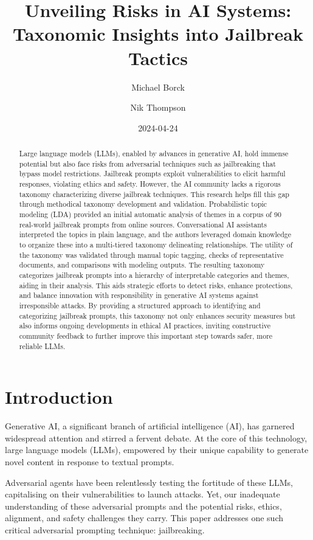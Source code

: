 \documentclass[
  letterpaper,
  DIV=11,
  numbers=noendperiod]{scrartcl}
\title{Unveiling Risks in AI Systems: Taxonomic Insights into Jailbreak
Tactics}
\author{Michael Borck \and Nik Thompson}
\date{2024-04-24}
\begin{document}
\maketitle
\begin{abstract}
Large language models (LLMs), enabled by advances in generative AI, hold
immense potential but also face risks from adversarial techniques such
as jailbreaking that bypass model restrictions. Jailbreak prompts
exploit vulnerabilities to elicit harmful responses, violating ethics
and safety. However, the AI community lacks a rigorous taxonomy
characterizing diverse jailbreak techniques. This research helps fill
this gap through methodical taxonomy development and validation.
Probabilistic topic modeling (LDA) provided an initial automatic
analysis of themes in a corpus of 90 real-world jailbreak prompts from
online sources. Conversational AI assistants interpreted the topics in
plain language, and the authors leveraged domain knowledge to organize
these into a multi-tiered taxonomy delineating relationships. The
utility of the taxonomy was validated through manual topic tagging,
checks of representative documents, and comparisons with modeling
outputs. The resulting taxonomy categorizes jailbreak prompts into a
hierarchy of interpretable categories and themes, aiding in their
analysis. This aids strategic efforts to detect risks, enhance
protections, and balance innovation with responsibility in generative AI
systems against irresponsible attacks. By providing a structured
approach to identifying and categorizing jailbreak prompts, this
taxonomy not only enhances security measures but also informs ongoing
developments in ethical AI practices, inviting constructive community
feedback to further improve this important step towards safer, more
reliable LLMs.
\end{abstract}

\section{Introduction}\label{introduction}

Generative AI, a significant branch of artificial intelligence (AI), has
garnered widespread attention and stirred a fervent debate. At the core
of this technology, large language models (LLMs), empowered by their
unique capability to generate novel content in response to textual
prompts.

Adversarial agents have been relentlessly testing the fortitude of these
LLMs, capitalising on their vulnerabilities to launch attacks. Yet, our
inadequate understanding of these adversarial prompts and the potential
risks, ethics, alignment, and safety challenges they carry. This paper
addresses one such critical adversarial prompting technique:
jailbreaking.
\end{document}
